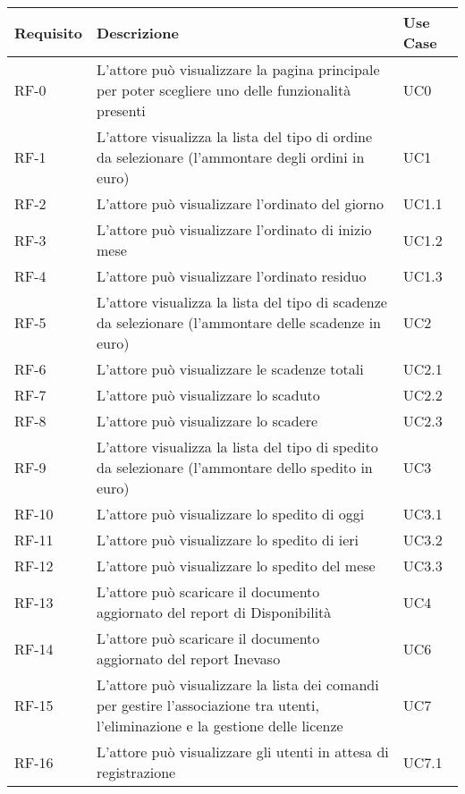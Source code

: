 \begin{tabular}{ |p{2cm}|p{8cm}|p{2cm}| }
 

 \hline
\textbf{ Requisito}   &  \textbf{Descrizione}    &  \textbf{    Use Case} \\ 

 \hline
  RF-0 &   L’attore può visualizzare la pagina principale per poter scegliere uno delle funzionalità presenti   & UC0 \\
 \hline
RF-1 &   L’attore visualizza la lista del tipo di ordine da selezionare (l’ammontare degli ordini in euro)  & UC1 \\
 \hline
 RF-2 & L’attore può visualizzare l’ordinato del giorno & UC1.1 \\
\hline
RF-3 & L’attore può visualizzare l’ordinato di inizio mese & UC1.2 \\
\hline
RF-4  &  L’attore può visualizzare l’ordinato residuo  & UC1.3 \\
\hline  
RF-5  & L’attore visualizza la lista del tipo di scadenze da selezionare  (l’ammontare delle scadenze in euro)  & UC2 \\
\hline
RF-6   & L’attore può visualizzare le scadenze totali   & UC2.1 \\
\hline
RF-7  &  L’attore può visualizzare lo scaduto & UC2.2 \\
\hline
RF-8   &  L’attore può visualizzare lo scadere & UC2.3 \\
\hline
RF-9   &  L’attore visualizza la lista del tipo di spedito da selezionare  (l’ammontare dello spedito in euro) & UC3 \\
 \hline
 RF-10   &  L’attore può visualizzare lo spedito di oggi & UC3.1 \\
  \hline
  RF-11   &  L’attore può visualizzare lo spedito di ieri & UC3.2 \\
   \hline
   RF-12  & L’attore può visualizzare lo spedito del mese  & UC3.3 \\
   \hline
   RF-13  &  L’attore può scaricare il documento aggiornato del report di Disponibilità & UC4 \\
   \hline
   RF-14  & L’attore può scaricare il documento aggiornato del report Inevaso   & UC6 \\
   \hline
RF-15    &  L’attore può visualizzare la lista dei comandi per gestire l’associazione tra utenti, l’eliminazione e la gestione delle licenze & UC7 \\
 \hline
   RF-16     & L’attore può visualizzare gli utenti in attesa di registrazione   & UC7.1 \\

\end{tabular}
